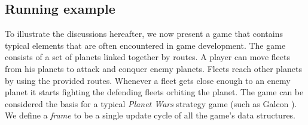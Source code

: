 \begin{comment}
General purpose \textbf{languages} (GPL) are suitable for any kind of computational task, including the development of games. This is due to the high expressive power deriving from the the availability of different GPLs for different kinds of abstractions. Every abstraction is built around specific problems, which introduces levels of difficulty in using such abstractions. C\#, Python, and Objective-C are typical examples \cite{languages_for_games1} of languages used for game development. A typical limitation in using GPLs is in expressing performance patterns, since the languages' focus is on the expressiveness. Optimizations that are significant in particular contexts (e.g., the context of game development) are not well expressed by GPLs (with the exception of SQL \cite{sql_indices} indexes). Complex code may require highly complex optimizations, depending on the context. Since such optimizations cannot be supported by a GPL, developers must implement them by hand. In game development, where optimizations of performance are a necessity, they increase the costs of development considerably. Unless the developers have access to large financial resources, the use of a GPL for game development is not a good choice, unless the game remains very small or does not need high performance. Some languages have been developed taking this into account for specific kinds of games. For instance, with CDML \cite{callahan2004cascade} developers are supposed to design their game around the producer-consumer design pattern in order to get the best support from the compilation process. With Inform, Ren'Py and Zillions of Games \cite{languages_for_games2} developers are limited to developing games within particular genres, such as storytelling or board games.
\end{comment}

\subsection{Running example}


To illustrate the discussions hereafter, we now present a game that contains typical elements that are often encountered in game development. The game consists of a set of planets linked together by routes. A player can move fleets from his planets to attack and conquer enemy planets. Fleets reach other planets by using the provided routes. Whenever a fleet gets close enough to an enemy planet it starts fighting the defending fleets orbiting the planet. The game can be considered the basis for a typical \emph{Planet Wars} strategy game (such as Galcon \cite{wiki:galcon}). We define a \textit{frame} to be a single update cycle of all the game's data structures.

